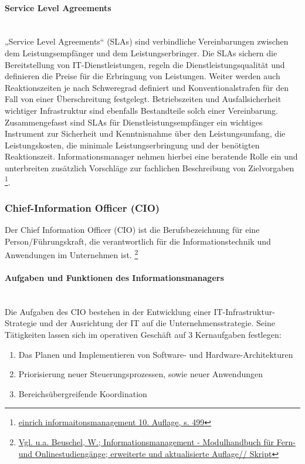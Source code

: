 \paragraph{Service Level Agreements}\mbox{}\\
„Service Level Agreements“ (SLAs) sind verbindliche Vereinbarungen zwischen dem Leistungsempfänger und dem Leistungserbringer. Die SLAs sichern die Bereitstellung von IT-Dienstleistungen, regeln die Dienstleistungsqualität und definieren die Preise für die Erbringung von Leistungen. Weiter werden auch Reaktionszeiten je nach Schweregrad definiert und Konventionalstrafen für den Fall von einer Überschreitung festgelegt. Betriebszeiten und Ausfallsicherheit wichtiger Infrastruktur sind ebenfalls Bestandteile solch einer Vereinbarung.
Zusammengefasst sind SLAs für Dienstleistungsempfänger ein wichtiges Instrument zur Sicherheit und Kenntnisnahme über den Leistungsumfang, die Leistungskosten, die minimale Leistungserbringung und der benötigten Reaktionszeit. Informationsmanager nehmen hierbei eine beratende Rolle ein und unterbreiten zusätzlich Vorschläge zur fachlichen Beschreibung von Zielvorgaben \footnote{\url{einrich informaitonsmanagement 10. Auflage, s. 499}}.


\subsubsection{Chief-Information Officer (CIO)}
Der Chief Information Officer (CIO) ist die Berufsbezeichnung für eine Person/Führungskraft, die verantwortlich für die Informationstechnik und Anwendungen im Unternehmen ist. \footnote{\url{Vgl. u.a. Beuschel, W.; Informationsmanagement - Modulhandbuch für Fern- und Onlinestudiengänge; erweiterte und aktualisierte Auflage// Skript}}


\paragraph{Aufgaben und Funktionen des Informationsmanagers}\mbox{}\\
Die Aufgaben des CIO bestehen in der Entwicklung einer IT-Infrastruktur-Strategie und der Ausrichtung der IT auf die Unternehmensstrategie. Seine Tätigkeiten lassen sich im operativen Geschäft auf 3 Kernaufgaben festlegen: 
\begin{enumerate}
    \item Das Planen und Implementieren von Software- und Hardware-Architekturen 
    \item Priorisierung neuer Steuerungsprozessen, sowie neuer Anwendungen
    \item Bereichsübergreifende Koordination
\end{enumerate}

